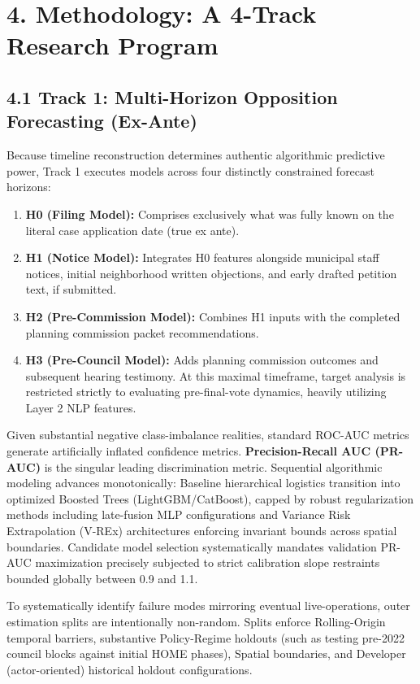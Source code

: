 \section*{4. Methodology: A 4-Track Research Program}

\subsection*{4.1 Track 1: Multi-Horizon Opposition Forecasting (Ex-Ante)}
Because timeline reconstruction determines authentic algorithmic predictive power, Track 1 executes models across four distinctly constrained forecast horizons:
\begin{enumerate}
 \item \textbf{H0 (Filing Model):} Comprises exclusively what was fully known on the literal case application date (true ex ante).
 \item \textbf{H1 (Notice Model):} Integrates H0 features alongside municipal staff notices, initial neighborhood written objections, and early drafted petition text, if submitted.
 \item \textbf{H2 (Pre-Commission Model):} Combines H1 inputs with the completed planning commission packet recommendations.
 \item \textbf{H3 (Pre-Council Model):} Adds planning commission outcomes and subsequent hearing testimony. At this maximal timeframe, target analysis is restricted strictly to evaluating pre-final-vote dynamics, heavily utilizing Layer 2 NLP features.
\end{enumerate}

Given substantial negative class-imbalance realities, standard ROC-AUC metrics generate artificially inflated confidence metrics. \textbf{Precision-Recall AUC (PR-AUC)} is the singular leading discrimination metric. Sequential algorithmic modeling advances monotonically: Baseline hierarchical logistics transition into optimized Boosted Trees (LightGBM/CatBoost), capped by robust regularization methods including late-fusion MLP configurations and Variance Risk Extrapolation (V-REx) architectures enforcing invariant bounds across spatial boundaries. Candidate model selection systematically mandates validation PR-AUC maximization precisely subjected to strict calibration slope restraints bounded globally between 0.9 and 1.1.

To systematically identify failure modes mirroring eventual live-operations, outer estimation splits are intentionally non-random. Splits enforce Rolling-Origin temporal barriers, substantive Policy-Regime holdouts (such as testing pre-2022 council blocks against initial HOME phases), Spatial boundaries, and Developer (actor-oriented) historical holdout configurations. 

